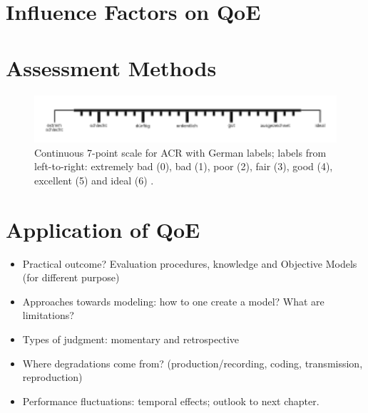\section{Influence Factors on \ac{QoE}} %

\section{Assessment Methods}


\begin{figure}
	\includegraphics[width=1\textwidth]{fig/quality7pt_scale}
	\caption{Continuous 7-point scale for \ac{ACR} with German labels; labels from left-to-right: extremely bad (0), bad (1), poor (2), fair (3), good (4), excellent (5) and ideal (6) \citep{itu-t_p.805:_2007}.}
	\label{img:chap02:quality-scale}
\end{figure}



\section{Application of {QoE}}
\begin{itemize}
\item Practical outcome? Evaluation procedures, knowledge and Objective Models (for different purpose)
\item Approaches towards modeling: how to one create a model? What are limitations?
\item Types of judgment: momentary and retrospective
\item Where degradations come from? (production/recording, coding, transmission, reproduction)
\item Performance fluctuations: temporal effects; outlook to next chapter.
\end{itemize}

